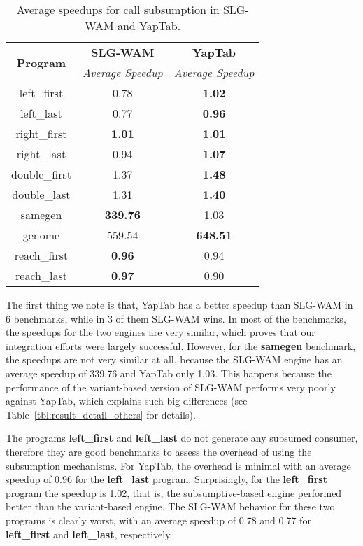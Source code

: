 \begin{table}[ht]
\centering
  \begin{tabular}{ccc}
   \hline
    \hline
    \multirow{2}{*}{\textbf{Program}} & \textbf{SLG-WAM} & \textbf{YapTab} \\
    & \textit{\small{Average Speedup}} & \textit{\small{Average Speedup}} \\
   \hline
   \hline
left\_first & 0.78 & \textbf{1.02} \\
left\_last & 0.77  & \textbf{0.96} \\
right\_first & \textbf{1.01} & \textbf{1.01} \\
right\_last & 0.94 & \textbf{1.07} \\
double\_first & 1.37 & \textbf{1.48} \\
double\_last & 1.31 & \textbf{1.40} \\
samegen & \textbf{339.76} & 1.03 \\
genome & 559.54 & \textbf{648.51} \\
reach\_first  & \textbf{0.96} & 0.94 \\
reach\_last  & \textbf{0.97} & 0.90 \\
\hline
\hline
\end{tabular}
\caption{Average speedups for call subsumption in SLG-WAM and YapTab.}
\label{tbl:results_overview}
\end{table}

The first thing we note is that,  YapTab has a better speedup than SLG-WAM in 6 benchmarks, while in 3 of
them SLG-WAM wins. In most of the benchmarks, the speedups for the two engines are very similar, which proves
that our integration efforts were  largely successful. However, for the \textbf{samegen} benchmark, the
speedups are not very similar at all, because the SLG-WAM engine has an average speedup of 339.76
and YapTab only 1.03. This happens because the performance of the variant-based version of SLG-WAM
performs very poorly against YapTab, which explains such big differences (see Table~\ref{tbl:result_detail_others}
for details).

The programs \textbf{left\_first} and \textbf{left\_last} do not generate any subsumed consumer,
therefore they are good benchmarks to assess the overhead of using the subsumption mechanisms. For YapTab,
the overhead is minimal with an average speedup of 0.96 for the \textbf{left\_last} program. Surprisingly, for the
\textbf{left\_first} program the speedup is 1.02, that is, the subsumptive-based engine performed better
than the variant-based engine. The SLG-WAM behavior for these two programs is clearly worst, with an average
speedup of 0.78 and 0.77 for \textbf{left\_first} and \textbf{left\_last}, respectively.

